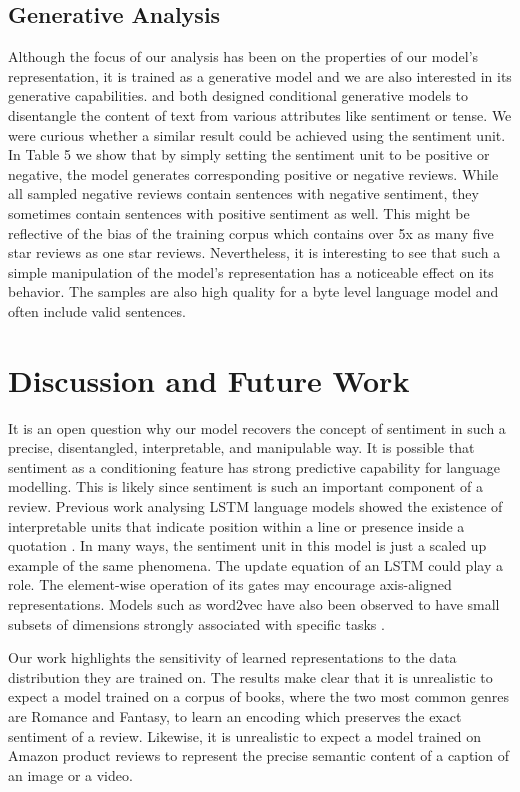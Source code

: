 \documentclass{article}
\begin{document}
\subsection{Generative Analysis}

Although the focus of our analysis has been on the properties of our model's representation, it is trained as a generative model and we are also interested in its generative capabilities. \citet{hu2017controllable} and \citet{dong2017learning} both designed conditional generative models to disentangle the content of text from various attributes like sentiment or tense. We were curious whether a similar result could be achieved using the sentiment unit. In Table 5 we show that by simply setting the sentiment unit to be positive or negative, the model generates corresponding positive or negative reviews. While all sampled negative reviews contain sentences with negative sentiment, they sometimes contain sentences with positive sentiment as well. This might be reflective of the bias of the training corpus which contains over 5x as many five star reviews as one star reviews. Nevertheless, it is interesting to see that such a simple manipulation of the model's representation has a noticeable effect on its behavior. The samples are also high quality for a byte level language model and often include valid sentences.

\section{Discussion and Future Work}
It is an open question why our model recovers the concept of sentiment in such a precise, disentangled, interpretable, and manipulable way. It is possible that sentiment as a conditioning feature has strong predictive capability for language modelling. This is likely since sentiment is such an important component of a review. Previous work analysing LSTM language models showed the existence of interpretable units that indicate position within a line or presence inside a quotation \cite{karpathy2015visualizing}. In many ways, the sentiment unit in this model is just a scaled up example of the same phenomena. The update equation of an LSTM could play a role. The element-wise operation of its gates may encourage axis-aligned representations. Models such as word2vec have also been observed to have small subsets of dimensions strongly associated with specific tasks \cite{li2016understanding}. 

Our work highlights the sensitivity of learned representations to the data distribution they are trained on. The results make clear that it is unrealistic to expect a model trained on a corpus of books, where the two most common genres are Romance and Fantasy, to learn an encoding which preserves the exact sentiment of a review. Likewise, it is unrealistic to expect a model trained on Amazon product reviews to represent the precise semantic content of a caption of an image or a video.
\end{document}
